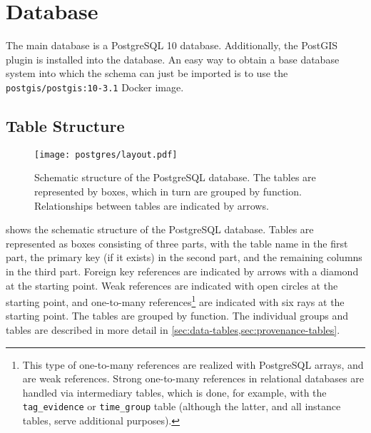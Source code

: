 \chapter{Database}
\label{chapter:database}

The main database is a PostgreSQL 10 database.
Additionally, the PostGIS plugin is installed into the database.
An easy way to obtain a base database system into which the schema can just be imported is to use the \verb!postgis/postgis:10-3.1! Docker image.


\section{Table Structure}

\begin{figure}[tb]
  \centering
  \texttt{[image: postgres/layout.pdf]}
  \caption{%
    Schematic structure of the PostgreSQL database.
    The tables are represented by boxes, which in turn are grouped by function.
    Relationships between tables are indicated by arrows.
    }
  \label{fig:db-structure}
\end{figure}

 shows the schematic structure of the PostgreSQL database.
Tables are represented as boxes consisting of three parts, with the table name in the first part, the primary key (if it exists) in the second part, and the remaining columns in the third part.
Foreign key references are indicated by
arrows with a diamond at the starting point.
Weak references are indicated with
open circles at the starting point, and one-to-many references\footnote{
  This type of one-to-many references are realized with PostgreSQL arrays, and are weak references.
  Strong one-to-many references in relational databases are handled via intermediary tables, which is done, for example, with the \texttt{tag\_evidence} or \texttt{time\_group} table (although the latter, and all instance tables, serve additional purposes).
}
are indicated with six rays at the starting point.
The tables are grouped by function.
The individual groups and tables are described in more detail in \cref{sec:data-tables,sec:provenance-tables}.


